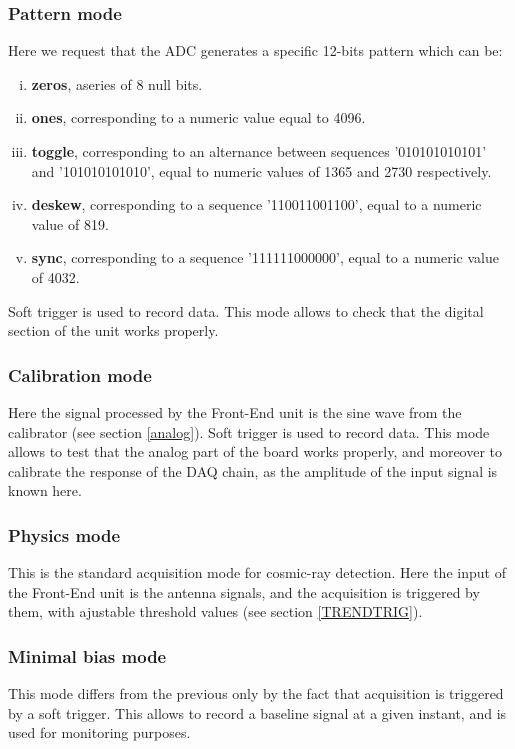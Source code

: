 \subsubsection{Pattern mode}
\label{pattern}
Here we request that the ADC generates a specific 12-bits pattern which can be:
\begin{enumerate}[i)]
\item{{\bf zeros}, aseries of 8 null bits.}
\item{{\bf ones}, corresponding to a numeric value equal to 4096.}
\item{{\bf toggle}, corresponding to an alternance between sequences '010101010101' and  '101010101010', equal to numeric values of 1365 and 2730 respectively.}
\item{{\bf deskew}, corresponding to a sequence '110011001100', equal to a numeric value of 819.}
\item{{\bf sync}, corresponding to a sequence '111111000000', equal to a numeric value of 4032.}
\end{enumerate} 
Soft trigger is used to record data. This mode allows to check that the digital section of the unit works properly.

\subsubsection{Calibration mode}
Here the signal processed by the Front-End unit is the sine wave from the calibrator (see section \ref{analog}). Soft trigger is used to record data. This mode allows to test that the analog part of the board works properly, and moreover to calibrate the response of the DAQ chain, as the amplitude of the input signal is known here.

\subsubsection{Physics mode}
This is the standard acquisition mode for cosmic-ray detection. Here the input of the Front-End unit is the antenna signals, and the acquisition is triggered by them, with ajustable threshold values (see section \ref{TRENDTRIG}).

\subsubsection{Minimal bias mode}
This mode differs from the previous only by the fact that acquisition is triggered by a soft trigger. This allows to record a baseline signal at a given instant, and is used for monitoring purposes. 

